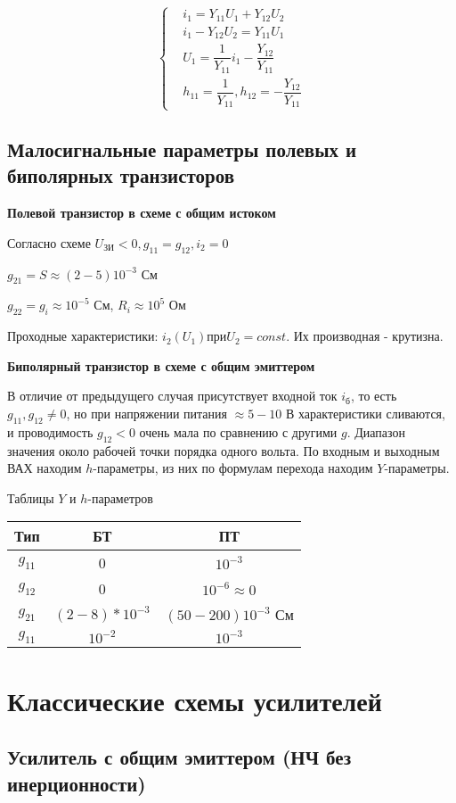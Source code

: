\documentclass[a4paper,12pt]{report}
\begin{document}
  \begin{equation}
  \left\{
\begin{aligned}
& i_1=Y_{11}U_1+Y_{12}U_2\\
& i_1-Y_{12}U_2=Y_{11}U_1\\
& U_1=\dfrac{1}{Y_{11}}i_1-\dfrac{Y_{12}}{Y_{11}}\\
& h_{11}=\dfrac{1}{Y_{11}}, h_{12}=-\dfrac{Y_{12}}{Y_{11}}
\end{aligned}
\right.
\end{equation}

\subsection{Малосигнальные параметры полевых и биполярных транзисторов}
\textbf{Полевой транзистор в схеме с общим истоком}

Согласно схеме $U_\text{ЗИ}<0, g_{11}=g_{12}, i_2=0$

$g_{21}=S \approx (2-5)10^{-3}$ См

$g_{22}=g_i \approx 10^{-5}$ См, $R_i \approx 10^5$ Ом

Проходные характеристики: $i_2(U_1) \text {при} U_2=const$. Их производная - крутизна.

\textbf{Биполярный транзистор в схеме с общим эмиттером}

В отличие от предыдущего случая присутствует входной ток $i_\text{б}$, то есть $g_11, g_12 \not =0$, но при напряжении питания $\approx 5-10$ В характеристики сливаются, и проводимость $g_{12}<0$ очень мала по сравнению с другими $g$. Диапазон значения около рабочей точки порядка одного вольта. По входным и выходным ВАХ находим $h$-параметры, из них по формулам перехода находим $Y$-параметры.

Таблицы $Y$ и $h$-параметров
\begin{tabular}{c|c|c}
  Тип& БТ & ПТ  \\ \hline
 $g_11$ & 0 & $10^{-3}$ \\
  $g_12$ & 0 & $10^{-6} \approx 0$\\
   $g_21$ & $(2-8)*10^{-3}$ & $(50-200)10^{-3}$ См\\
    $g_11$ & $10^{-2}$ & $10^{-3}$\\
\end{tabular}

\section{Классические схемы усилителей}
\subsection{Усилитель с общим эмиттером (НЧ без инерционности)}
\end{document}
